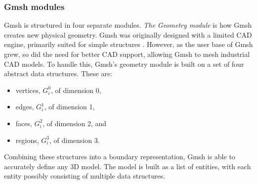 \subsubsection{Gmsh modules}
\label{sec:gmsh-modules}
Gmsh is structured in four separate modules. \emph{The Geometry module} is how Gmsh creates new physical geometry. Gmsh was originally designed with a limited CAD engine, primarily suited for simple structures \cite{Gmsh_article}. However, as the user base of Gmsh grew, so did the need for better CAD support, allowing Gmsh to mesh industrial CAD models. To handle this, Gmsh's geometry module is built on a set of four abstract data structures. These are:
\begin{itemize}
    \item vertices, $G_i^0$, of dimension 0,
    \item edges, $G_i^1$, of dimension 1,
    \item faces, $G_i^2$, of dimension 2, and
    \item regions, $G_i^3$, of dimension 3.
\end{itemize}
Combining these structures into a boundary representation, Gmsh is able to accurately define any 3D model. The model is built as a list of entities, with each entity possibly consisting of multiple data structures.

